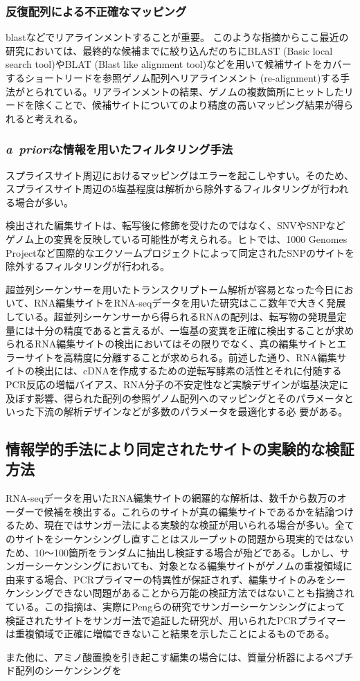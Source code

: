 \subsubsection{反復配列による不正確なマッピング}
blastなどでリアラインメントすることが重要。
このような指摘からここ最近の研究においては、最終的な候補までに絞り込んだのちにBLAST (Basic local search tool)やBLAT (Blast like alignment tool)などを用いて候補サイトをカバーするショートリードを参照ゲノム配列へリアラインメント (re-alignment)する手法がとられている。リアラインメントの結果、ゲノムの複数箇所にヒットしたリードを除くことで、候補サイトについてのより精度の高いマッピング結果が得られると考えれる。

\subsubsection{\textit{a\ priori}な情報を用いたフィルタリング手法}
スプライスサイト周辺におけるマッピングはエラーを起こしやすい。そのため、スプライスサイト周辺の5塩基程度は解析から除外するフィルタリングが行われる場合が多い。
\par
検出された編集サイトは、転写後に修飾を受けたのではなく、SNVやSNPなどゲノム上の変異を反映している可能性が考えられる。ヒトでは、1000 Genomes Projectなど国際的なエクソームプロジェクトによって同定されたSNPのサイトを除外するフィルタリングが行われる。
\par
超並列シーケンサーを用いたトランスクリプトーム解析が容易となった今日において、RNA編集サイトをRNA-seqデータを用いた研究はここ数年で大きく発展している。超並列シーケンサーから得られるRNAの配列は、転写物の発現量定量には十分の精度であると言えるが、一塩基の変異を正確に検出することが求められるRNA編集サイトの検出においてはその限りでなく、真の編集サイトとエラーサイトを高精度に分離することが求められる。前述した通り、RNA編集サイトの検出には、cDNAを作成するための逆転写酵素の活性とそれに付随するPCR反応の増幅バイアス、RNA分子の不安定性など実験デザインが塩基決定に及ぼす影響、得られた配列の参照ゲノム配列へのマッピングとそのパラメータといった下流の解析デザインなどが多数のパラメータを最適化する必
要がある。

\subsection{情報学的手法により同定されたサイトの実験的な検証方法}
RNA-seqデータを用いたRNA編集サイトの網羅的な解析は、数千から数万のオーダーで候補を検出する。これらのサイトが真の編集サイトであるかを結論つけるため、現在ではサンガー法による実験的な検証が用いられる場合が多い。全てのサイトをシーケンシングし直すことはスループットの問題から現実的ではないため、10〜100箇所をランダムに抽出し検証する場合が殆どである。しかし、サンガーシーケンシングにおいても、対象となる編集サイトがゲノムの重複領域に由来する場合、PCRプライマーの特異性が保証されず、編集サイトのみをシーケンシングできない問題があることから万能の検証方法ではないことも指摘されている。この指摘は、実際にPengらの研究でサンガーシーケンシングによって検証されたサイトをサンガー法で追証した研究が、用いられたPCRプライマーは重複領域で正確に増幅できないこと結果を示したことによるものである。
\par
また他に、アミノ酸置換を引き起こす編集の場合には、質量分析器によるペプチド配列のシーケンシングを

